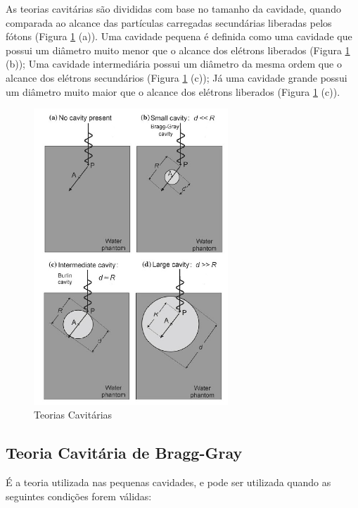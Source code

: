 \documentclass[11pt,a4paper]{article}
\begin{document}
		As teorias cavitárias são divididas com base no tamanho da cavidade, quando comparada ao alcance das partículas carregadas secundárias liberadas pelos fótons (Figura \ref{fig:teoriasDasCavidades} (a)). Uma cavidade pequena é definida como uma cavidade que possui um diâmetro muito menor que o alcance dos elétrons liberados (Figura \ref{fig:teoriasDasCavidades} (b)); Uma cavidade intermediária possui um diâmetro da mesma ordem que o alcance dos elétrons secundários (Figura \ref{fig:teoriasDasCavidades} (c)); Já uma cavidade grande possui um diâmetro muito maior que o alcance dos elétrons liberados (Figura \ref{fig:teoriasDasCavidades} (c)). 

		\begin{figure}[h]
			\centering
			\includegraphics[width=0.65\textwidth]{Imagens/teoriasDasCavidades.jpg}
			\caption{Teorias Cavitárias}
			\label{fig:teoriasDasCavidades}
		\end{figure}

		
		\subsection{Teoria Cavitária de Bragg-Gray}

			É a teoria utilizada nas pequenas cavidades, e pode ser utilizada quando as seguintes condições forem válidas:
\end{document}
